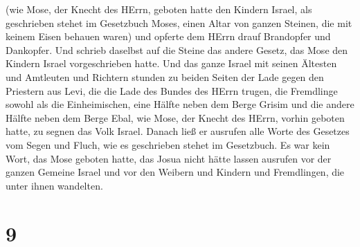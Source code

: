 (wie Mose, der Knecht des HErrn, geboten hatte den Kindern Israel, als
geschrieben stehet im Gesetzbuch Moses, einen Altar von ganzen Steinen,
die mit keinem Eisen behauen waren) und opferte dem HErrn drauf
Brandopfer und Dankopfer.  Und schrieb daselbst auf die
Steine das andere Gesetz, das Mose den Kindern Israel vorgeschrieben
hatte.  Und das ganze Israel mit seinen Ältesten und
Amtleuten und Richtern stunden zu beiden Seiten der Lade gegen den
Priestern aus Levi, die die Lade des Bundes des HErrn trugen, die
Fremdlinge sowohl als die Einheimischen, eine Hälfte neben dem Berge
Grisim und die andere Hälfte neben dem Berge Ebal, wie Mose, der Knecht
des HErrn, vorhin geboten hatte, zu segnen das Volk Israel.
 Danach ließ er ausrufen alle Worte des Gesetzes vom Segen
und Fluch, wie es geschrieben stehet im Gesetzbuch.  Es war
kein Wort, das Mose geboten hatte, das Josua nicht hätte lassen ausrufen
vor der ganzen Gemeine Israel und vor den Weibern und Kindern und
Fremdlingen, die unter ihnen wandelten.

\hypertarget{section-8}{%
\section{9}\label{section-8}}

